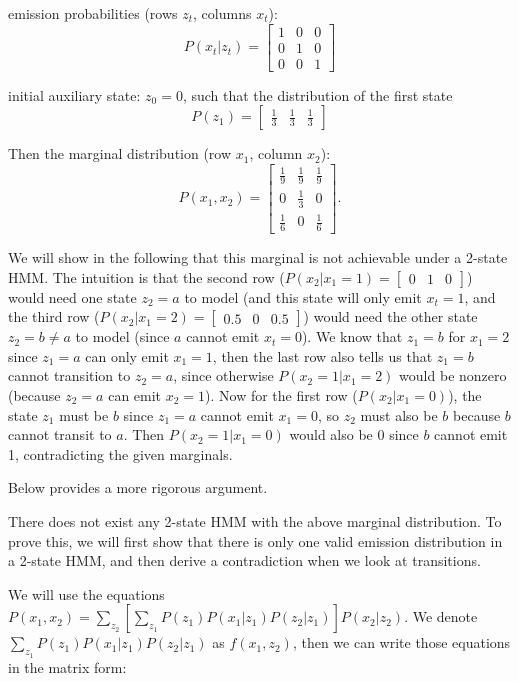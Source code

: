 \documentclass{article}
\begin{document}
emission probabilities (rows $z_t$, columns $x_t$):
$$P(x_t|z_t) = \begin{bmatrix}1 &0 & 0 \\ 0 & 1 & 0 \\ 0 & 0 &1\end{bmatrix}$$

initial auxiliary state: $z_0 = 0$,
such that the distribution of the first state
$$P(z_1) =  \begin{bmatrix}\frac{1}{3} & \frac{1}{3} & \frac{1}{3}\end{bmatrix}$$

Then the marginal distribution (row $x_1$, column $x_2$):
$$
P(x_1, x_2) = \begin{bmatrix}
    \frac{1}{9} & \frac{1}{9} & \frac{1}{9} \\
    0 & \frac{1}{3} & 0 \\
    \frac{1}{6} & 0 & \frac{1}{6}
\end{bmatrix}.
$$

We will show in the following that this marginal is not achievable under a 2-state HMM.
The intuition is that the second row ($P(x_2|x_1=1)= \begin{bmatrix}0& 1 & 0\end{bmatrix}$)
would need one state $z_2=a$ to model
(and this state will only emit $x_t=1$, and the third row
($P(x_2|x_1=2)= \begin{bmatrix}0.5& 0 & 0.5\end{bmatrix}$)
would need the other state $z_2=b\ne a$ to model (since $a$ cannot emit $x_t=0$).
We know that $z_1=b$ for $x_1=2$ since $z_1=a$ can only emit $x_1=1$,
then the last row also tells us that $z_1=b$ cannot transition to $z_2=a$,
since otherwise $P(x_2=1|x_1=2)$ would be nonzero (because $z_2=a$ can emit $x_2=1$).
Now for the first row ($P(x_2|x_1=0)$),
the state $z_1$ must be $b$ since $z_1=a$ cannot emit $x_1=0$,
so $z_2$ must also be $b$ because $b$ cannot transit to $a$.
Then $P(x_2=1|x_1=0)$ would also be 0 since $b$ cannot emit 1,
contradicting the given marginals.

Below provides a more rigorous argument.

There does not exist any 2-state HMM with the above marginal distribution.
To prove this, we will first show that there is only one valid emission distribution
in a 2-state HMM, and then derive a contradiction when we look at transitions.

We will use the equations
$P(x_1, x_2) = \sum_{z_2}\left[\sum_{z_1}P(z_1)P(x_1|z_1)P(z_2|z_1)\right]P(x_2|z_2)$.
We denote $\sum_{z_1}P(z_1)P(x_1|z_1)P(z_2|z_1)$ as $f(x_1,z_2)$,
then we can write those equations in the matrix form:
\end{document}
